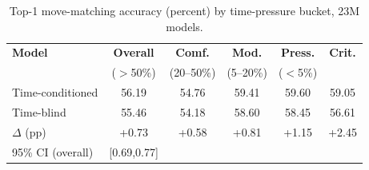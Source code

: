 \begin{table}[t]
\caption{Top-1 move-matching accuracy (percent) by time-pressure bucket, 23M models.}
\label{tab:accuracy}
\centering
\renewcommand{\arraystretch}{1.2}
\begin{tabular}{lccccc}
\hline
\textbf{Model} & \textbf{Overall} & \textbf{Comf.} & \textbf{Mod.} & \textbf{Press.} & \textbf{Crit.} \\
  & ($>$50\%) & (20--50\%) & (5--20\%) & ($<$5\%) \\
\hline
Time-conditioned & 56.19 & 54.76 & 59.41 & 59.60 & 59.05 \\
Time-blind       & 55.46 & 54.18 & 58.60 & 58.45 & 56.61 \\
\hline
$\Delta$ (pp)   & +0.73 & +0.58 & +0.81 & +1.15 & +2.45 \\
95\% CI (overall) & {\scriptsize[0.69,0.77]} &  &  &  & \\
\hline
\end{tabular}
\end{table}
